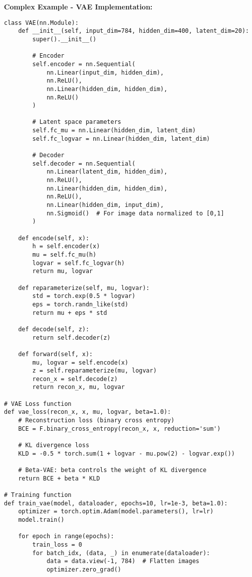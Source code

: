\documentclass[11pt,a4paper]{book}
\begin{document}
\textbf{Complex Example - VAE Implementation:}
\begin{verbatim}
class VAE(nn.Module):
    def __init__(self, input_dim=784, hidden_dim=400, latent_dim=20):
        super().__init__()
        
        # Encoder
        self.encoder = nn.Sequential(
            nn.Linear(input_dim, hidden_dim),
            nn.ReLU(),
            nn.Linear(hidden_dim, hidden_dim),
            nn.ReLU()
        )
        
        # Latent space parameters
        self.fc_mu = nn.Linear(hidden_dim, latent_dim)
        self.fc_logvar = nn.Linear(hidden_dim, latent_dim)
        
        # Decoder
        self.decoder = nn.Sequential(
            nn.Linear(latent_dim, hidden_dim),
            nn.ReLU(),
            nn.Linear(hidden_dim, hidden_dim),
            nn.ReLU(),
            nn.Linear(hidden_dim, input_dim),
            nn.Sigmoid()  # For image data normalized to [0,1]
        )
    
    def encode(self, x):
        h = self.encoder(x)
        mu = self.fc_mu(h)
        logvar = self.fc_logvar(h)
        return mu, logvar
    
    def reparameterize(self, mu, logvar):
        std = torch.exp(0.5 * logvar)
        eps = torch.randn_like(std)
        return mu + eps * std
    
    def decode(self, z):
        return self.decoder(z)
    
    def forward(self, x):
        mu, logvar = self.encode(x)
        z = self.reparameterize(mu, logvar)
        recon_x = self.decode(z)
        return recon_x, mu, logvar

# VAE Loss function
def vae_loss(recon_x, x, mu, logvar, beta=1.0):
    # Reconstruction loss (binary cross entropy)
    BCE = F.binary_cross_entropy(recon_x, x, reduction='sum')
    
    # KL divergence loss
    KLD = -0.5 * torch.sum(1 + logvar - mu.pow(2) - logvar.exp())
    
    # Beta-VAE: beta controls the weight of KL divergence
    return BCE + beta * KLD

# Training function
def train_vae(model, dataloader, epochs=10, lr=1e-3, beta=1.0):
    optimizer = torch.optim.Adam(model.parameters(), lr=lr)
    model.train()
    
    for epoch in range(epochs):
        train_loss = 0
        for batch_idx, (data, _) in enumerate(dataloader):
            data = data.view(-1, 784)  # Flatten images
            optimizer.zero_grad()
            

\end{verbatim}
\end{document}
